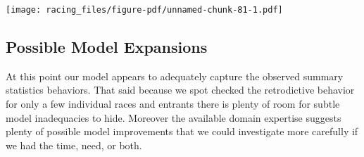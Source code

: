 \documentclass[
  letterpaper,
  DIV=11,
  numbers=noendperiod]{scrartcl}
\newenvironment{Shaded}{\begin{snugshade}}{\end{snugshade}}
\newcommand{\AttributeTok}[1]{\textcolor[rgb]{0.40,0.45,0.13}{#1}}
\newcommand{\ConstantTok}[1]{\textcolor[rgb]{0.56,0.35,0.01}{#1}}
\newcommand{\DecValTok}[1]{\textcolor[rgb]{0.68,0.00,0.00}{#1}}
\newcommand{\FloatTok}[1]{\textcolor[rgb]{0.68,0.00,0.00}{#1}}
\newcommand{\FunctionTok}[1]{\textcolor[rgb]{0.28,0.35,0.67}{#1}}
\newcommand{\NormalTok}[1]{\textcolor[rgb]{0.00,0.23,0.31}{#1}}
\newcommand{\SpecialCharTok}[1]{\textcolor[rgb]{0.37,0.37,0.37}{#1}}
\newcommand{\StringTok}[1]{\textcolor[rgb]{0.13,0.47,0.30}{#1}}
\begin{document}
\begin{Shaded}
\end{Shaded}

\texttt{[image: racing\_files/figure-pdf/unnamed-chunk-81-1.pdf]}

\subsection{Possible Model Expansions}\label{possible-model-expansions}

At this point our model appears to adequately capture the observed
summary statistics behaviors. That said because we spot checked the
retrodictive behavior for only a few individual races and entrants there
is plenty of room for subtle model inadequacies to hide. Moreover the
available domain expertise suggests plenty of possible model
improvements that we could investigate more carefully if we had the
time, need, or both.
\end{document}
